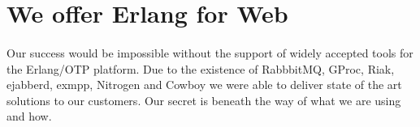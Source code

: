 \documentclass[11pt]{article}
\begin{document}


\section*{We offer Erlang for Web}
\paragraph{}
Our success would be impossible without the support of widely accepted tools for the Erlang/OTP platform.
Due to the existence of RabbbitMQ, GProc, Riak, ejabberd, exmpp, Nitrogen and
Cowboy we were able to deliver state of the art solutions to our customers. 
Our secret is beneath the way of what we are using and how.



\end{document}
